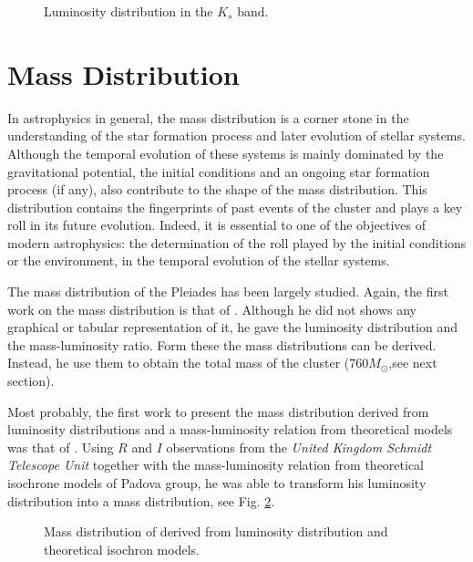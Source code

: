 \begin{figure}[htbp]
\begin{center}
\caption{Luminosity distribution in the $K_s$ band.}
\label{fig:LumBouy}
\end{center}
\end{figure}

\section{Mass Distribution}

In astrophysics in general, the mass distribution is a corner stone in the understanding of the star formation process and later evolution of stellar systems. Although the temporal evolution of these systems is mainly dominated by the gravitational potential, the initial conditions and an ongoing star formation process (if any), also contribute to the shape of the mass distribution. This distribution contains the fingerprints of past events of the cluster and plays a key roll in its future evolution. Indeed, it is essential to one of the objectives of modern astrophysics: the determination of the roll played by the initial conditions or the environment, in the temporal evolution of the stellar systems. 

The mass distribution of the Pleiades has been largely studied. Again, the first work on the mass distribution is that of \citet{Limber1962}. Although he did not shows any graphical or tabular representation of it, he gave the luminosity distribution and the mass-luminosity ratio. Form these the mass distributions can be derived. Instead, he use them to obtain the total mass of the cluster ($760 M_{\odot}$,see next section). 

Most probably, the first work to present the mass distribution derived from luminosity distributions and a mass-luminosity relation from theoretical models was that of \citet{Hambly1991}. Using $R$ and $I$ observations from the \emph{United Kingdom Schmidt Telescope Unit} together with the mass-luminosity relation from theoretical isochrone models of Padova group, he was able to transform his luminosity distribution into a mass distribution, see Fig. \ref{fig:massHambly}. 

\begin{figure}[htbp]
\begin{center}
\caption{Mass distribution of \citet{Hambly1991} derived from luminosity distribution and theoretical isochron models.}
\label{fig:massHambly}
\end{center}
\end{figure}

